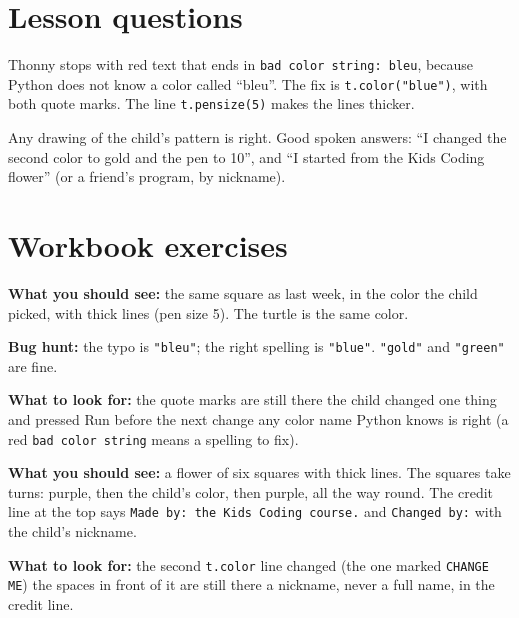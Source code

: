 
\section{Lesson questions}
\begin{answer}
Thonny stops with red text that ends in \texttt{bad color string: bleu}, because Python does not know a color called \enquote{bleu}. The fix is \texttt{t.color("blue")}, with both quote marks. The line \texttt{t.pensize(5)} makes the lines thicker.
\end{answer}

\begin{answer}[Reflection]
Any drawing of the child's pattern is right. Good spoken answers: \enquote{I changed the second color to gold and the pen to 10}, and \enquote{I started from the Kids Coding flower} (or a friend's program, by nickname).
\end{answer}

\section{Workbook exercises}
\begin{answer}
\textbf{What you should see:} the same square as last week, in the color the child picked, with thick lines (pen size 5). The turtle is the same color.

\textbf{Bug hunt:} the typo is \texttt{"bleu"}; the right spelling is \texttt{"blue"}. \texttt{"gold"} and \texttt{"green"} are fine.

\textbf{What to look for:} \tickbox{} the quote marks are still there \quad \tickbox{} the child changed one thing and pressed Run before the next change \quad \tickbox{} any color name Python knows is right (a red \texttt{bad color string} means a spelling to fix).
\end{answer}

\begin{answer}
\textbf{What you should see:} a flower of six squares with thick lines. The squares take turns: purple, then the child's color, then purple, all the way round. The credit line at the top says \texttt{Made by: the Kids Coding course.} and \texttt{Changed by:} with the child's nickname.

\textbf{What to look for:} \tickbox{} the second \texttt{t.color} line changed (the one marked \texttt{CHANGE ME}) \quad \tickbox{} the spaces in front of it are still there \quad \tickbox{} a nickname, never a full name, in the credit line.
\end{answer}

